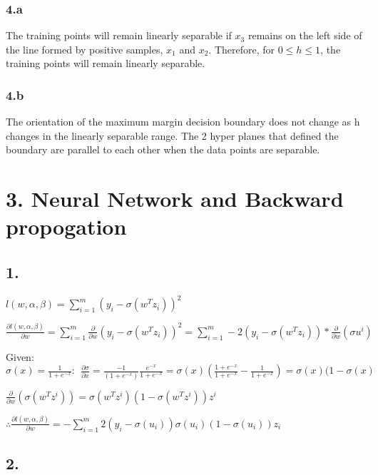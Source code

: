 \documentclass[
]{article}
\begin{document}
\hypertarget{a}{%
\subsubsection{4.a}\label{a}}

The training points will remain linearly separable if \(x_3\) remains on
the left side of the line formed by positive samples, \(x_1\) and
\(x_2\). Therefore, for \(0\le h \le1\), the training points will remain
linearly separable.

\hypertarget{b}{%
\subsubsection{4.b}\label{b}}

The orientation of the maximum margin decision boundary does not change
as h changes in the linearly separable range. The 2 hyper planes that
defined the boundary are parallel to each other when the data points are
separable.

\hypertarget{neural-network-and-backward-propogation}{%
\section{3. Neural Network and Backward
propogation}\label{neural-network-and-backward-propogation}}

\hypertarget{section-4}{%
\subsection{1.}\label{section-4}}

\(l(w, \alpha, \beta) = \sum_{i=1}^m (y_i - \sigma(w^T z_i))^2\)

\(\frac {\partial l(w, \alpha, \beta)}{\partial w}=\sum_{i=1}^m \frac{\partial}{\partial w} (y_i - \sigma(w^T z_i))^2 = \sum_{i=1}^m -2(y_i - \sigma(w^T z_i)) * \frac{\partial}{\partial w}(\sigma u^i)\)

Given:
\(\sigma(x) = \frac{1}{1+e^{-x}}: \ \ \frac{\partial \sigma}{\partial x}=\frac{-1}{(1+e^{-x})} \frac{e^{-x}}{1+e^{-x}} = \sigma(x)(\frac{1+e^{-x}}{1+e^{-x}} - \frac{1}{1+e^{-x}})=\sigma(x) (1-\sigma(x)\)

\(\frac{\partial}{\partial w}(\sigma (w^T z^i)) = \sigma(w^T z^i)(1- \sigma(w^T z^i))z^i\)

\(\therefore \frac{\partial l(w, \alpha, \beta)}{\partial w} = -\sum_{i=1}^m 2(y_i - \sigma(u_i))\sigma(u_i)(1 - \sigma(u_i))z_i\)

\hypertarget{section-5}{%
\subsection{2.}\label{section-5}}
\end{document}
